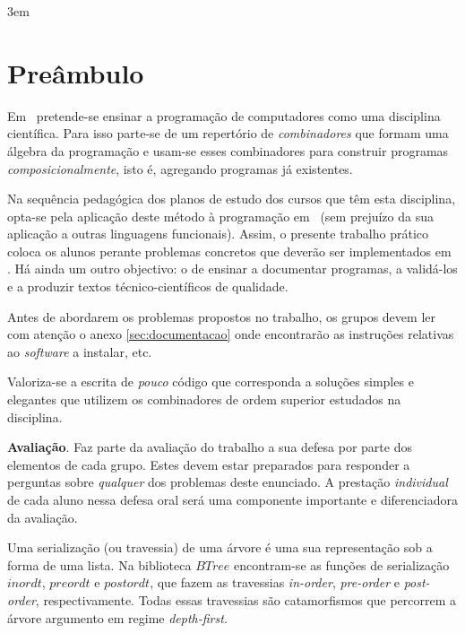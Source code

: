 \documentclass[11pt, a4paper, fleqn]{article}
\newcommand{\Conid}[1]{\mathit{#1}}
\newcommand{\Varid}[1]{\mathit{#1}}
\begin{document}
\sffamily
\setlength{\parindent}{0em}
\emergencystretch 3em
\renewcommand{\baselinestretch}{1.25} 

\pagestyle{pagestyle}

\setlength{\parindent}{1em}

\section*{Preâmbulo}

Em \CP\ pretende-se ensinar a progra\-mação de computadores
como uma disciplina científica. Para isso parte-se de um repertório de \emph{combinadores}
que formam uma álgebra da programação %
e usam-se esses combinadores para construir programas \emph{composicionalmente},
isto é, agregando programas já existentes.

Na sequência pedagógica dos planos de estudo dos cursos que têm
esta disciplina, opta-se pela aplicação deste método à programação
em \Haskell\ (sem prejuízo da sua aplicação a outras linguagens
funcionais). Assim, o presente trabalho prático coloca os
alunos perante problemas concretos que deverão ser implementados em
\Haskell. Há ainda um outro objectivo: o de ensinar a documentar
programas, a validá-los e a produzir textos técnico-científicos de
qualidade.

Antes de abordarem os problemas propostos no trabalho, os grupos devem ler
com atenção o anexo \ref{sec:documentacao} onde encontrarão as instruções
relativas ao \emph{software} a instalar, etc.

Valoriza-se a escrita de \emph{pouco} código que corresponda a soluções
simples e elegantes que utilizem os combinadores de ordem superior estudados
na disciplina.

\noindent \textbf{Avaliação}. Faz parte da avaliação do trabalho a sua defesa
por parte dos elementos de cada grupo. Estes devem estar preparados para
responder a perguntas sobre \emph{qualquer} dos problemas deste enunciado.
A prestação \emph{individual} de cada aluno nessa defesa oral será uma componente
importante e diferenciadora da avaliação.


\Problema

Uma serialização (ou travessia) de uma árvore é uma sua representação sob a forma de uma lista. 
Na biblioteca \ensuremath{\Conid{BTree}} encontram-se as funções de serialização \ensuremath{\Varid{inordt}}, \ensuremath{\Varid{preordt}} e \ensuremath{\Varid{postordt}},
que fazem as travessias \emph{in-order}, \emph{ pre-order} e \emph{post-order}, respectivamente.
Todas essas travessias são catamorfismos que percorrem a árvore argumento em regime \emph{depth-first}.
\end{document}
